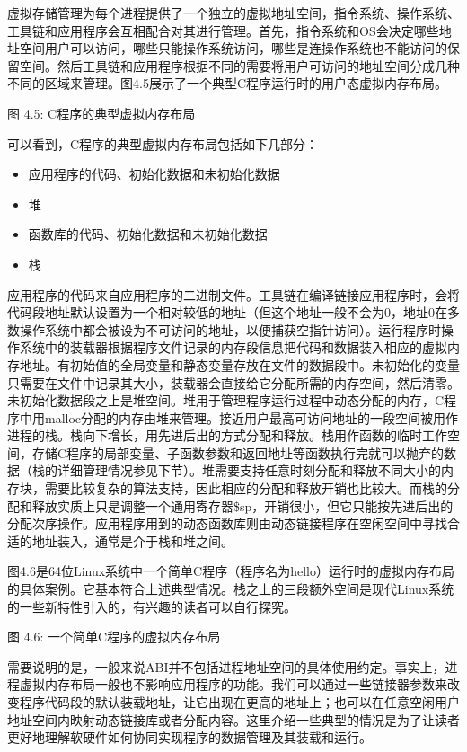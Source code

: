 \documentclass[]{ctexbook}
\providecommand{\tightlist}{%
  \setlength{\itemsep}{0pt}\setlength{\parskip}{0pt}}
\begin{document}
虚拟存储管理为每个进程提供了一个独立的虚拟地址空间，指令系统、操作系统、工具链和应用程序会互相配合对其进行管理。首先，指令系统和OS会决定哪些地址空间用户可以访问，哪些只能操作系统访问，哪些是连操作系统也不能访问的保留空间。然后工具链和应用程序根据不同的需要将用户可访问的地址空间分成几种不同的区域来管理。图4.5展示了一个典型C程序运行时的用户态虚拟内存布局。

图 4.5: C程序的典型虚拟内存布局

可以看到，C程序的典型虚拟内存布局包括如下几部分：

\begin{itemize}
\tightlist
\item
  应用程序的代码、初始化数据和未初始化数据
\item
  堆
\item
  函数库的代码、初始化数据和未初始化数据
\item
  栈
\end{itemize}

应用程序的代码来自应用程序的二进制文件。工具链在编译链接应用程序时，会将代码段地址默认设置为一个相对较低的地址（但这个地址一般不会为0，地址0在多数操作系统中都会被设为不可访问的地址，以便捕获空指针访问）。运行程序时操作系统中的装载器根据程序文件记录的内存段信息把代码和数据装入相应的虚拟内存地址。有初始值的全局变量和静态变量存放在文件的数据段中。未初始化的变量只需要在文件中记录其大小，装载器会直接给它分配所需的内存空间，然后清零。未初始化数据段之上是堆空间。堆用于管理程序运行过程中动态分配的内存，C程序中用malloc分配的内存由堆来管理。接近用户最高可访问地址的一段空间被用作进程的栈。栈向下增长，用先进后出的方式分配和释放。栈用作函数的临时工作空间，存储C程序的局部变量、子函数参数和返回地址等函数执行完就可以抛弃的数据（栈的详细管理情况参见下节）。堆需要支持任意时刻分配和释放不同大小的内存块，需要比较复杂的算法支持，因此相应的分配和释放开销也比较大。而栈的分配和释放实质上只是调整一个通用寄存器\$sp，开销很小，但它只能按先进后出的分配次序操作。应用程序用到的动态函数库则由动态链接程序在空闲空间中寻找合适的地址装入，通常是介于栈和堆之间。

图4.6是64位Linux系统中一个简单C程序（程序名为hello）运行时的虚拟内存布局的具体案例。它基本符合上述典型情况。栈之上的三段额外空间是现代Linux系统的一些新特性引入的，有兴趣的读者可以自行探究。

图 4.6: 一个简单C程序的虚拟内存布局

需要说明的是，一般来说ABI并不包括进程地址空间的具体使用约定。事实上，进程虚拟内存布局一般也不影响应用程序的功能。我们可以通过一些链接器参数来改变程序代码段的默认装载地址，让它出现在更高的地址上；也可以在任意空闲用户地址空间内映射动态链接库或者分配内容。这里介绍一些典型的情况是为了让读者更好地理解软硬件如何协同实现程序的数据管理及其装载和运行。
\end{document}
